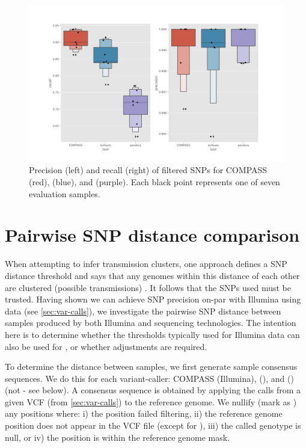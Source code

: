 \begin{figure}
\begin{center}
\includegraphics[width=0.9\columnwidth]{Chapter2/Figs/combined-precision-recall-filters-snps.png}
\caption{{Precision (left) and recall (right) of filtered SNPs for COMPASS (red), \bcftools{} (blue), and \pandora{} (purple). Each black point represents one of seven evaluation samples. 
{\label{fig:prec-recall-filters}}%
}}
\end{center}
\end{figure}


\section{Pairwise SNP distance comparison}
\label{sec:snp-dist}

When attempting to infer transmission clusters, one approach defines a SNP distance threshold and says that any genomes within this distance of each other are clustered (possible transmissions) \cite{walker2013}. It follows that the SNPs used must be trusted. Having shown we can achieve SNP precision on-par with Illumina using \ont{} data (see \autoref{sec:var-calls}), we investigate the pairwise SNP distance between samples produced by both Illumina and \ont{} sequencing technologies. The intention here is to determine whether the thresholds typically used for Illumina data can also be used for \ont{}, or whether adjustments are required.

To determine the distance between samples, we first generate sample consensus sequences. We do this for each variant-caller: COMPASS (Illumina), \bcftools{} (\ont{}), and \pandora{}  (\ont{}) (not \compare{} - see below). A consensus sequence is obtained by applying the calls from a given VCF (from \autoref{sec:var-calls}) to the \mtb{} reference genome. We nullify (mark as ) any positions where: i) the position failed filtering, ii) the reference genome position does not appear in the VCF file (except for \map{}), iii) the called genotype is null, or iv) the position is within the reference genome mask. 

